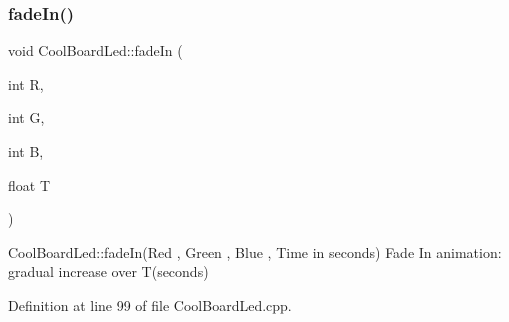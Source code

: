 \subsubsection{\texorpdfstring{fade\+In()}{fadeIn()}}
{\footnotesize\ttfamily void Cool\+Board\+Led\+::fade\+In (\begin{DoxyParamCaption}\item[{int}]{R,  }\item[{int}]{G,  }\item[{int}]{B,  }\item[{float}]{T }\end{DoxyParamCaption})}

Cool\+Board\+Led\+::fade\+In(\+Red , Green , Blue , Time in seconds) Fade In animation\+: gradual increase over T(seconds) 

Definition at line 99 of file Cool\+Board\+Led.\+cpp.



